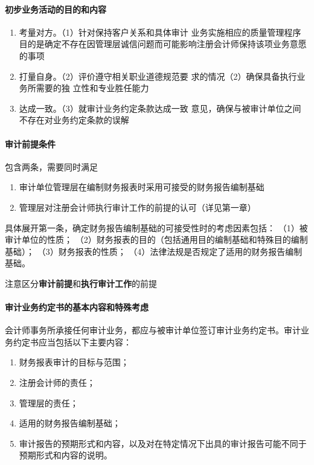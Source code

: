 \documentclass[UTF8,12pt]{ctexart}
\numberwithin{equation}{section} %
\numberwithin{figure}{section}
\numberwithin{table}{section}
\begin{document}
	\paragraph{初步业务活动的目的和内容}
	\begin{enumerate}
		\item 考量对方。（1）针对保持客户关系和具体审计
		业务实施相应的质量管理程序目的是确定不存在因管理层诚信问题而可能影响注册会计师保持该项业务意愿的事项
		
		\item 打量自身。（2）评价遵守相关职业道德规范要
		求的情况（2）确保具备执行业务所需要的独
		立性和专业胜任能力
		
		\item 达成一致。（3）就审计业务约定条款达成一致
		意见，确保与被审计单位之间不存在对业务约定条款的误解
	\end{enumerate}
	
	\paragraph{审计前提条件}
	包含两条，需要同时满足
	\begin{enumerate}
		\item 审计单位管理层在编制财务报表时采用可接受的财务报告编制基础
		
		\item 管理层对注册会计师执行审计工作的前提的认可（详见第一章）
	\end{enumerate}
	
	具体展开第一条，确定财务报告编制基础的可接受性时的考虑因素包括：
	（1）被审计单位的性质；
	（2）财务报表的目的（包括通用目的编制基础和特殊目的编制基础）；
	（3）财务报表的性质；
	（4）法律法规是否规定了适用的财务报告编制基础。
	
	注意区分\textbf{审计前提}和\textbf{执行审计工作}的前提
	\paragraph{审计业务约定书的基本内容和特殊考虑}

	会计师事务所承接任何审计业务，都应与被审计单位签订审计业务约定书。审计业务约定书应当包括以下主要内容：
	\begin{enumerate}
		\item 财务报表审计的目标与范围；
		
		\item 注册会计师的责任；
		
		\item 管理层的责任；
		
		\item 适用的财务报告编制基础；
		
		\item 审计报告的预期形式和内容，以及对在特定情况下出具的审计报告可能不同于预期形式和内容的说明。
	\end{enumerate}
	
\end{document}
